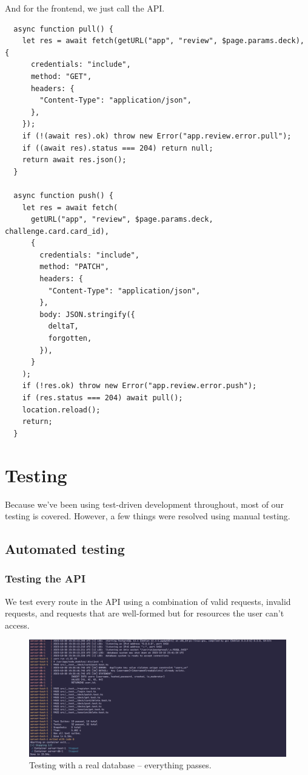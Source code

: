 \documentclass{report}
\begin{document}
And for the frontend, we just call the API.
\begin{verbatim}
  async function pull() {
    let res = await fetch(getURL("app", "review", $page.params.deck), {
      credentials: "include",
      method: "GET",
      headers: {
        "Content-Type": "application/json",
      },
    });
    if (!(await res).ok) throw new Error("app.review.error.pull");
    if ((await res).status === 204) return null;
    return await res.json();
  }

  async function push() {
    let res = await fetch(
      getURL("app", "review", $page.params.deck, challenge.card.card_id),
      {
        credentials: "include",
        method: "PATCH",
        headers: {
          "Content-Type": "application/json",
        },
        body: JSON.stringify({
          deltaT,
          forgotten,
        }),
      }
    );
    if (!res.ok) throw new Error("app.review.error.push");
    if (res.status === 204) await pull();
    location.reload();
    return;
  }
\end{verbatim}

\chapter{Testing}
Because we've been using test-driven development throughout, most of our testing is covered. However, a few things were resolved using manual testing.

\section{Automated testing}
\subsection{Testing the API}
We test every route in the API using a combination of valid requests, invalid requests, and requests that are well-formed but for resources the user can't access.

\begin{figure}
  \centering
  \includegraphics[width=\textwidth]{./media/testing/pass.png}
  \caption{Testing with a real database -- everything passes.}
  \label{fig:testresults}
\end{figure}
\end{document}
